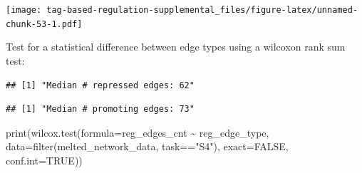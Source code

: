 \documentclass[
]{book}
\newenvironment{Shaded}{\begin{snugshade}}{\end{snugshade}}
\newcommand{\AttributeTok}[1]{\textcolor[rgb]{0.77,0.63,0.00}{#1}}
\newcommand{\ConstantTok}[1]{\textcolor[rgb]{0.00,0.00,0.00}{#1}}
\newcommand{\FunctionTok}[1]{\textcolor[rgb]{0.00,0.00,0.00}{#1}}
\newcommand{\NormalTok}[1]{#1}
\newcommand{\SpecialCharTok}[1]{\textcolor[rgb]{0.00,0.00,0.00}{#1}}
\newcommand{\StringTok}[1]{\textcolor[rgb]{0.31,0.60,0.02}{#1}}
\begin{document}
\texttt{[image: tag-based-regulation-supplemental\_files/figure-latex/unnamed-chunk-53-1.pdf]}

Test for a statistical difference between edge types using a wilcoxon rank sum test:

\begin{Shaded}
\end{Shaded}

\begin{verbatim}
## [1] "Median # repressed edges: 62"
\end{verbatim}

\begin{Shaded}
\end{Shaded}

\begin{verbatim}
## [1] "Median # promoting edges: 73"
\end{verbatim}

\begin{Shaded}
\begin{Highlighting}[]
\FunctionTok{print}\NormalTok{(}\FunctionTok{wilcox.test}\NormalTok{(}\AttributeTok{formula=}\NormalTok{reg\_edges\_cnt }\SpecialCharTok{\textasciitilde{}}\NormalTok{ reg\_edge\_type, }\AttributeTok{data=}\FunctionTok{filter}\NormalTok{(melted\_network\_data, task}\SpecialCharTok{==}\StringTok{"S4"}\NormalTok{), }\AttributeTok{exact=}\ConstantTok{FALSE}\NormalTok{, }\AttributeTok{conf.int=}\ConstantTok{TRUE}\NormalTok{))}
\end{Highlighting}
\end{Shaded}
\end{document}
